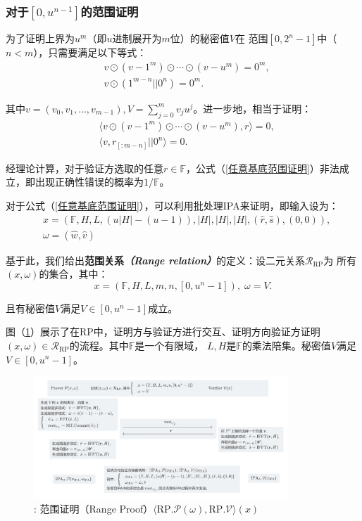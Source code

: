 \documentclass[zihao=-4]{ctexart}
\begin{document}
\begin{spacing}{1.5}
\subsubsection{对于$[0,u^{n-1}]$的范围证明}
为了证明上界为$u^m$（即$u$进制展开为$m$位）的秘密值$V$在
范围$[0,2^n-1]$中（$n<m$），只需要满足以下等式：
\begin{equation}
  \begin{aligned}
    &v\odot(v-1^m)\odot\cdots\odot(v-u^m)=0^m,\\
    &v\odot(1^{m-n}||0^n)=0^m.
  \end{aligned}
\end{equation}\par
其中$v=(v_0,v_1,\ldots,v_{m-1}),V=\sum\limits_{j=0}^mv_ju^j$。进一步地，相当于证明：
\begin{equation}
  \begin{aligned}
    &\langle v\odot(v-1^m)\odot\cdots\odot(v-u^m),r\rangle=0,\\
    &\langle v,r_{[:m-n]}||0^n\rangle=0.
    \label{任意基底范围证明}
  \end{aligned}
\end{equation}\par
经理论计算，对于验证方选取的任意$r\in\mathbb{F}$，公式（\ref{任意基底范围证明}）非法成立，即出现正确性错误的概率为$1/\mathbb{F}$。\par
对于公式（\ref{任意基底范围证明}），可以利用批处理IPA来证明，即输入设为：
\begin{equation}
  \begin{aligned}
    &x=(\mathbb{F},H,L,(u|H|-(u-1)),|H|,|H|,|H|,(\hat{r},\hat{s}),(0,0)),\\
    &\omega=(\hat{w},\hat{v})
  \end{aligned}
\end{equation}\par
基于此，我们给出\textbf{范围关系\emph{（Range relation）}}的定义：设二元关系$\mathcal{R}_{\text{RP}}$为
所有$(x,\omega)$的集合，其中：
\[
  x=(\mathbb{F},H,L,m,n,[0,u^n-1]),\;\omega=V.
\]\par
且有秘密值$V$满足$V\in[0,u^n-1]$成立。\par
图（\ref{RP流程}）展示了在RP中，证明方与验证方进行交互、证明方向验证方证明
$(x,\omega)\in\mathcal{R}_{\text{RP}}$的流程。其中$\mathbb{F}$是一个有限域，
$L,H$是$\mathbb{F}$的乘法陪集。秘密值$V$满足$V\in[0,u^n-1]$。
\begin{figure}[H]
  \centering
  \includegraphics[width=0.85\textwidth]{./include_picture/RP.png}
  \caption{: 范围证明（Range Proof）$\langle \text{RP}.\mathcal{P}(\omega),\text{RP}.\mathcal{V}\rangle(x)$}
  \label{RP流程}
\end{figure}


\end{spacing}
\end{document}
